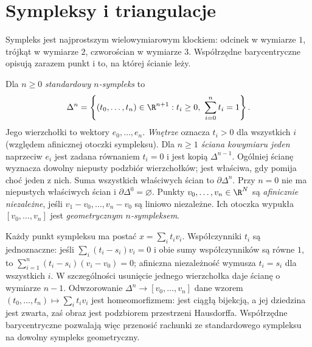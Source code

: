 \section{Sympleksy i triangulacje}
\label{sec:sympleksy}

Sympleks jest najprostszym wielowymiarowym
klockiem: odcinek w wymiarze $1$, trójkąt
w wymiarze $2$, czworościan w wymiarze $3$.
Współrzędne barycentryczne opisują
zarazem punkt i to, na której ścianie leży.

\begin{definicja}
\label{def:sympleks-standardowy}
Dla $n\geq0$ \emph{standardowy $n$-sympleks}
to
\[
 \Delta^n=
 \left\{(t_0,\ldots,t_n)\in\R^{n+1}:
 t_i\geq0,\ \sum_{i=0}^{n}t_i=1\right\}.
\]
Jego wierzchołki to wektory $e_0,\ldots,e_n$.
\emph{Wnętrze} oznacza $t_i>0$ dla wszystkich $i$
(względem afinicznej otoczki sympleksu).
Dla $n\geq1$ \emph{ściana kowymiaru jeden} naprzeciw $e_i$
jest zadana równaniem $t_i=0$ i jest kopią $\Delta^{n-1}$.
Ogólniej ścianę wyznacza dowolny niepusty podzbiór wierzchołków;
jest właściwa, gdy pomija choć jeden z nich.
Suma wszystkich właściwych ścian to $\partial\Delta^n$.
Przy $n=0$ nie ma niepustych właściwych ścian i $\partial\Delta^0=\varnothing$.
Punkty $v_0,\ldots,v_n\in\R^N$
są \emph{afinicznie niezależne}, jeśli
$v_1-v_0,\ldots,v_n-v_0$ są liniowo
niezależne. Ich otoczka wypukła
$[v_0,\ldots,v_n]$ jest
\emph{geometrycznym $n$-sympleksem}.
\end{definicja}

Każdy punkt sympleksu ma postać
$x=\sum_i t_iv_i$. Współczynniki
$t_i$ są jednoznaczne: jeśli
$\sum_i(t_i-s_i)v_i=0$ i obie sumy
współczynników są równe $1$, to
$\sum_{i=1}^n(t_i-s_i)(v_i-v_0)=0$;
afiniczna niezależność wymusza
$t_i=s_i$ dla wszystkich $i$.
W szczególności usunięcie jednego
wierzchołka daje ścianę
o wymiarze $n-1$.
Odwzorowanie $\Delta^n\to[v_0,\ldots,v_n]$ dane wzorem
$(t_0,\ldots,t_n)\mapsto\sum_i t_iv_i$ jest homeomorfizmem:
jest ciągłą bijekcją, a jej dziedzina jest zwarta,
zaś obraz jest podzbiorem przestrzeni Hausdorffa.
Współrzędne barycentryczne pozwalają więc przenosić
rachunki ze standardowego sympleksu na dowolny
sympleks geometryczny.

